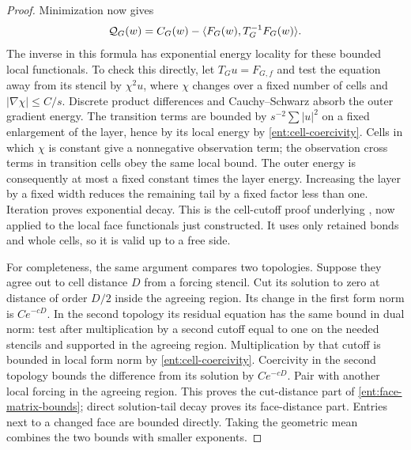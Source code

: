 \begin{proof}
Minimization now gives
\[
 \mathcal Q_G(w)
       =C_G(w)-\langle F_G(w),T_G^{-1}F_G(w)\rangle.
\]
The inverse in this formula has exponential energy locality for
these bounded local functionals.  To check this directly, let
\(T_Gu=F_{G,f}\) and test the equation away from its stencil by
\(\chi^2u\), where \(\chi\) changes over a fixed number of cells
and \(|\nabla\chi|\le C/s\).  Discrete product differences and
Cauchy--Schwarz absorb the outer gradient energy.  The transition
terms are bounded by \(s^{-2}\sum|u|^2\) on a fixed enlargement
of the layer, hence by its local energy by
\eqref{ent:cell-coercivity}.  Cells in which \(\chi\) is constant
give a nonnegative observation term; the observation cross terms
in transition cells obey the same local bound.  The outer energy
is consequently at most a fixed constant times the layer energy.
Increasing the layer by a fixed width reduces the remaining tail
by a fixed factor less than one.  Iteration proves exponential
decay.  This is the cell-cutoff proof underlying
\cite[Proposition~3.14]{B}, now applied to the local face
functionals just constructed.  It uses only retained bonds and
whole cells, so it is valid up to a free side.

For completeness, the same argument compares two topologies.
Suppose they agree out to cell distance \(D\) from a forcing
stencil.  Cut its solution to zero at distance of order \(D/2\)
inside the agreeing region.  Its change in the first form norm
is \(Ce^{-cD}\).  In the second topology its residual equation
has the same bound in dual norm: test after multiplication by
a second cutoff equal to one on the needed stencils and supported
in the agreeing region.  Multiplication by that cutoff is bounded
in local form norm by \eqref{ent:cell-coercivity}.  Coercivity in
the second topology bounds the difference from its solution by
\(Ce^{-cD}\).  Pair with another local forcing in the agreeing
region.  This proves the cut-distance part of
\eqref{ent:face-matrix-bounds}; direct solution-tail decay proves
its face-distance part.  Entries next to a changed face are
bounded directly.  Taking the geometric mean combines the two
bounds with smaller exponents.


\end{proof}
